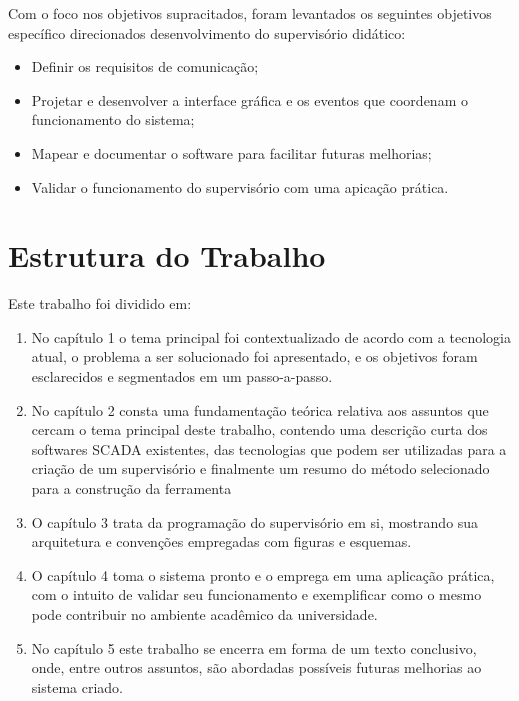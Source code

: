Com o foco nos objetivos supracitados, foram levantados os seguintes objetivos específico direcionados desenvolvimento do supervisório didático:

\begin{itemize}
	\item Definir os requisitos de comunicação;
	\item Projetar e desenvolver a interface gráfica e os eventos que coordenam o funcionamento do sistema;
	\item Mapear e documentar o software para facilitar futuras melhorias;
	\item Validar o funcionamento do supervisório com uma apicação prática.
\end{itemize}

\section{Estrutura do Trabalho}

Este trabalho foi dividido em:

\begin{enumerate}
	\item No capítulo 1 o tema principal foi contextualizado de acordo com a tecnologia atual, o problema a ser solucionado foi apresentado, e os objetivos foram esclarecidos e segmentados em um passo-a-passo.
	\item No capítulo 2 consta uma fundamentação teórica relativa aos assuntos que cercam o tema principal deste trabalho, contendo uma descrição curta dos softwares SCADA existentes, das tecnologias que podem ser utilizadas para a criação de um supervisório e finalmente um resumo do método selecionado para a construção da ferramenta
	\item O capítulo 3 trata da programação do supervisório em si, mostrando sua arquitetura e convenções empregadas com figuras e esquemas.
	\item O capítulo 4 toma o sistema pronto e o emprega em uma aplicação prática, com o intuito de validar seu funcionamento e exemplificar como o mesmo pode contribuir no ambiente acadêmico da universidade.
	\item No capítulo 5 este trabalho se encerra em forma de um texto conclusivo, onde, entre outros assuntos, são abordadas possíveis futuras melhorias ao sistema criado.
\end{enumerate}
